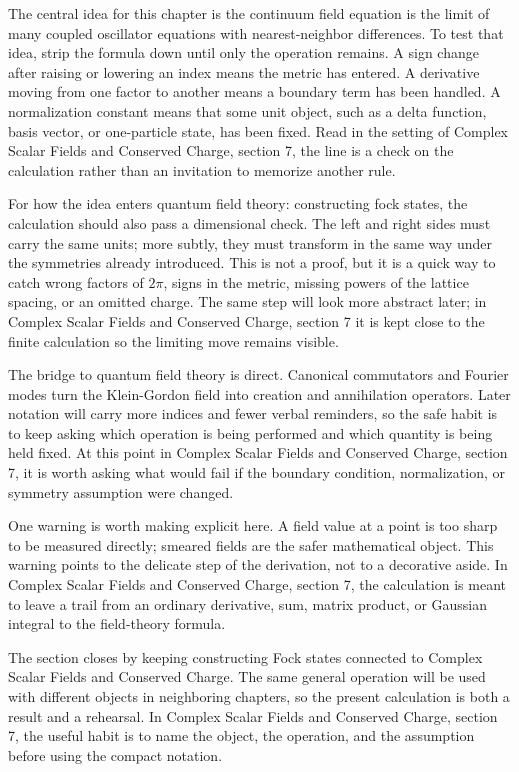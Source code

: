 The central idea for this chapter is the continuum field equation is the limit of many coupled oscillator equations with nearest-neighbor differences.  To test that idea, strip the formula down until only the operation remains.  A sign change after raising or lowering an index means the metric has entered.  A derivative moving from one factor to another means a boundary term has been handled.  A normalization constant means that some unit object, such as a delta function, basis vector, or one-particle state, has been fixed.  Read in the setting of Complex Scalar Fields and Conserved Charge, section 7, the line is a check on the calculation rather than an invitation to memorize another rule.

For how the idea enters quantum field theory: constructing fock states, the calculation should also pass a dimensional check.  The left and right sides must carry the same units; more subtly, they must transform in the same way under the symmetries already introduced.  This is not a proof, but it is a quick way to catch wrong factors of \(2\pi\), signs in the metric, missing powers of the lattice spacing, or an omitted charge.  The same step will look more abstract later; in Complex Scalar Fields and Conserved Charge, section 7 it is kept close to the finite calculation so the limiting move remains visible.

The bridge to quantum field theory is direct.  Canonical commutators and Fourier modes turn the Klein-Gordon field into creation and annihilation operators.  Later notation will carry more indices and fewer verbal reminders, so the safe habit is to keep asking which operation is being performed and which quantity is being held fixed.  At this point in Complex Scalar Fields and Conserved Charge, section 7, it is worth asking what would fail if the boundary condition, normalization, or symmetry assumption were changed.

One warning is worth making explicit here.  A field value at a point is too sharp to be measured directly; smeared fields are the safer mathematical object.  This warning points to the delicate step of the derivation, not to a decorative aside.  In Complex Scalar Fields and Conserved Charge, section 7, the calculation is meant to leave a trail from an ordinary derivative, sum, matrix product, or Gaussian integral to the field-theory formula.

The section closes by keeping constructing Fock states connected to Complex Scalar Fields and Conserved Charge.  The same general operation will be used with different objects in neighboring chapters, so the present calculation is both a result and a rehearsal.  In Complex Scalar Fields and Conserved Charge, section 7, the useful habit is to name the object, the operation, and the assumption before using the compact notation.



